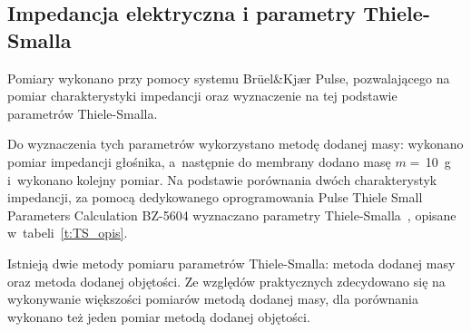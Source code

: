 \documentclass[12pt]{oska}
\begin{document}
		\subsection{Impedancja elektryczna i parametry Thiele-Smalla}
			
			Pomiary wykonano przy pomocy systemu Brüel\&Kjær Pulse, pozwalającego na pomiar charakterystyki impedancji oraz wyznaczenie na tej podstawie parametrów Thiele-Smalla.
			
			Do wyznaczenia tych parametrów wykorzystano metodę dodanej masy: wykonano pomiar impedancji głośnika, a~następnie do membrany dodano masę $m=\,$\SI{10}{\gram} i~wykonano kolejny pomiar. Na podstawie porównania dwóch charakterystyk impedancji, za pomocą dedykowanego oprogramowania Pulse Thiele Small Parameters Calculation BZ-5604 wyznaczano parametry Thiele-Smalla~\cite{BK_pulse_TS}, opisane w~tabeli~\ref{t:TS_opis}.
			
			Istnieją dwie metody pomiaru parametrów Thiele-Smalla: metoda dodanej masy oraz metoda dodanej objętości. Ze względów praktycznych zdecydowano się na wykonywanie większości pomiarów metodą dodanej masy, dla porównania wykonano też jeden pomiar metodą dodanej objętości.
			
\end{document}
